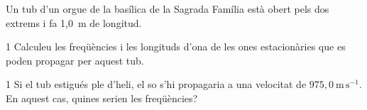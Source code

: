 Un tub d'un orgue de la basílica de la Sagrada Família està obert pels dos extrems i fa 1,0~m de longitud.

\begin{apartat}{1}
Calculeu les freqüències i les longituds d'ona de les ones estacionàries que es poden propagar per aquest tub.
\end{apartat}

\begin{apartat}{1}
Si el tub estigués ple d'heli, el so s'hi propagaria a una velocitat de $975,0\ \mathrm{m\,s^{-1}}$. En aquest cas, quines serien les freqüències?
\end{apartat}


